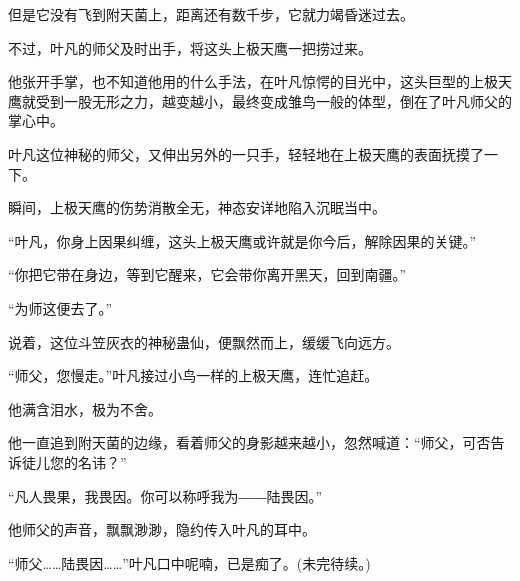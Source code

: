 \begin{this_body}
但是它没有飞到附天菌上，距离还有数千步，它就力竭昏迷过去。

不过，叶凡的师父及时出手，将这头上极天鹰一把捞过来。

他张开手掌，也不知道他用的什么手法，在叶凡惊愕的目光中，这头巨型的上极天鹰就受到一股无形之力，越变越小，最终变成雏鸟一般的体型，倒在了叶凡师父的掌心中。

叶凡这位神秘的师父，又伸出另外的一只手，轻轻地在上极天鹰的表面抚摸了一下。

瞬间，上极天鹰的伤势消散全无，神态安详地陷入沉眠当中。

“叶凡，你身上因果纠缠，这头上极天鹰或许就是你今后，解除因果的关键。”

“你把它带在身边，等到它醒来，它会带你离开黑天，回到南疆。”

“为师这便去了。”

说着，这位斗笠灰衣的神秘蛊仙，便飘然而上，缓缓飞向远方。

“师父，您慢走。”叶凡接过小鸟一样的上极天鹰，连忙追赶。

他满含泪水，极为不舍。

他一直追到附天菌的边缘，看着师父的身影越来越小，忽然喊道：“师父，可否告诉徒儿您的名讳？”

“凡人畏果，我畏因。你可以称呼我为――陆畏因。”

他师父的声音，飘飘渺渺，隐约传入叶凡的耳中。

“师父……陆畏因……”叶凡口中呢喃，已是痴了。(未完待续。)

\end{this_body}

